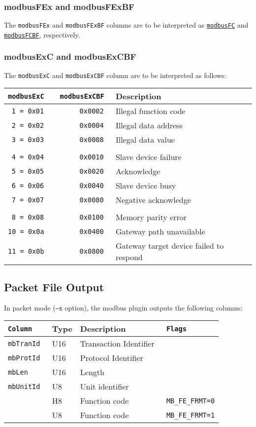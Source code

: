 \documentclass[documentation]{subfiles}
\begin{document}
\subsubsection{modbusFEx and modbusFExBF}\label{modbusFEx}
The {\tt modbusFEx} and {\tt modbusFExBF} columns are to be interpreted as {\tt\hyperref[modbusFC]{modbusFC}} and {\tt\hyperref[modbusFC]{modbusFCBF}}, respectively.

\subsubsection{modbusExC and modbusExCBF}\label{modbusExC}
The {\tt modbusExC} and {\tt modbusExCBF} column are to be interpreted as follows:
\begin{longtable}{>{\tt}r>{\tt}rl}
    \toprule
    {\bf modbusExC} & {\bf modbusExCBF} & {\bf Description}\\
    \midrule\endhead%
     1 = 0x01 & 0x0002 & Illegal function code\\
     2 = 0x02 & 0x0004 & Illegal data address\\
     3 = 0x03 & 0x0008 & Illegal data value\\
     \\
     4 = 0x04 & 0x0010 & Slave device failure\\
     5 = 0x05 & 0x0020 & Acknowledge\\
     6 = 0x06 & 0x0040 & Slave device busy\\
     7 = 0x07 & 0x0080 & Negative acknowledge\\
     \\
     8 = 0x08 & 0x0100 & Memory parity error\\
    10 = 0x0a & 0x0400 & Gateway path unavailable\\
    11 = 0x0b & 0x0800 & Gateway target device failed to respond\\
    \bottomrule
\end{longtable}

\subsection{Packet File Output}
In packet mode ({\tt --s} option), the modbus plugin outputs the following columns:
\begin{longtable}{>{\tt}lll>{\tt\small}l}
    \toprule
    {\bf Column}         & {\bf Type} & {\bf Description} & {\bf Flags}\\
    \midrule\endhead%
    mbTranId             & U16        & Transaction Identifier & \\
    mbProtId             & U16        & Protocol Identifier    & \\
    mbLen                & U16        & Length                 & \\
    mbUnitId             & U8         & Unit identifier        & \\
    \nameref{mbFuncCode} & H8         & Function code          & MB\_FE\_FRMT=0\\
    \nameref{mbFuncCode} & U8         & Function code          & MB\_FE\_FRMT=1\\
    \bottomrule
\end{longtable}
\end{document}
